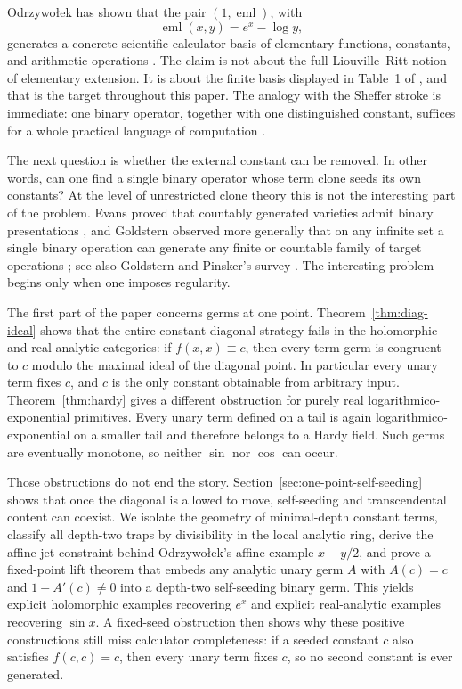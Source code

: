 \documentclass[11pt]{amsart}
\numberwithin{equation}{section}
\theoremstyle{remark}
\theoremstyle{definition}
\newcommand{\eml}{\operatorname{eml}}
\begin{document}
Odrzywo{\l}ek has shown that the pair $(1,\eml)$, with
\begin{equation}\label{eq:intro-eml}
\eml(x,y)=e^x-\log y,
\end{equation}
generates a concrete scientific-calculator basis of elementary functions, constants, and arithmetic operations \cite{Odrzywolek2026}. The claim is not about the full Liouville--Ritt notion of elementary extension. It is about the finite basis displayed in Table~1 of \cite{Odrzywolek2026}, and that is the target throughout this paper. The analogy with the Sheffer stroke is immediate: one binary operator, together with one distinguished constant, suffices for a whole practical language of computation \cite{Sheffer1913}.

The next question is whether the external constant can be removed. In other words, can one find a single binary operator whose term clone seeds its own constants? At the level of unrestricted clone theory this is not the interesting part of the problem. Evans proved that countably generated varieties admit binary presentations \cite{Evans1989}, and Goldstern observed more generally that on any infinite set a single binary operation can generate any finite or countable family of target operations \cite{Goldstern2010}; see also Goldstern and Pinsker's survey \cite{GoldsternPinsker2008}. The interesting problem begins only when one imposes regularity.

The first part of the paper concerns germs at one point. Theorem~\ref{thm:diag-ideal} shows that the entire constant-diagonal strategy fails in the holomorphic and real-analytic categories: if $f(x,x)\equiv c$, then every term germ is congruent to $c$ modulo the maximal ideal of the diagonal point. In particular every unary term fixes $c$, and $c$ is the only constant obtainable from arbitrary input. Theorem~\ref{thm:hardy} gives a different obstruction for purely real logarithmico-exponential primitives. Every unary term defined on a tail is again logarithmico-exponential on a smaller tail and therefore belongs to a Hardy field. Such germs are eventually monotone, so neither $\sin$ nor $\cos$ can occur.

Those obstructions do not end the story. Section~\ref{sec:one-point-self-seeding} shows that once the diagonal is allowed to move, self-seeding and transcendental content can coexist. We isolate the geometry of minimal-depth constant terms, classify all depth-two traps by divisibility in the local analytic ring, derive the affine jet constraint behind Odrzywo{\l}ek's affine example $x-y/2$, and prove a fixed-point lift theorem that embeds any analytic unary germ $A$ with $A(c)=c$ and $1+A'(c)\neq 0$ into a depth-two self-seeding binary germ. This yields explicit holomorphic examples recovering $e^x$ and explicit real-analytic examples recovering $\sin x$. A fixed-seed obstruction then shows why these positive constructions still miss calculator completeness: if a seeded constant $c$ also satisfies $f(c,c)=c$, then every unary term fixes $c$, so no second constant is ever generated.
\end{document}
